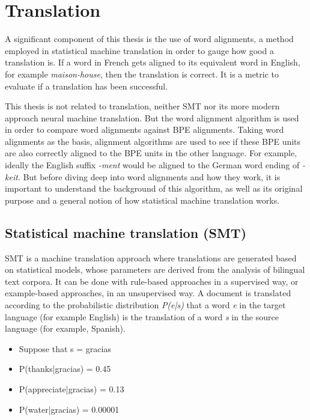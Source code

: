 %
%

\section{Translation}\label{ch:translation}

A significant component of this thesis is the use of word alignments, a method employed in statistical machine translation in order to gauge how good a translation is. If a word in French gets aligned to its equivalent word in English, for example \emph{maison-house}, then the translation is correct. It is a metric to evaluate if a translation has been successful.

This thesis is not related to translation, neither SMT nor its more modern approach neural machine translation. But the word alignment algorithm is used in order to compare word alignments against BPE alignments. Taking word alignments as the basis, alignment algorithms are used to see if these BPE units are also correctly aligned to the BPE units in the other language. For example, ideally the English suffix \emph{-ment} would be aligned to the German word ending of \emph{-keit}. But before diving deep into word alignments and how they work, it is important to understand the background of this algorithm, as well as its original purpose and a general notion of how statistical machine translation works.

\subsection{Statistical machine translation (SMT)}

SMT is a machine translation approach where translations are generated based on statistical models, whose parameters are derived from the analysis of bilingual text corpora. It can be done with rule-based approaches in a supervised way, or example-based approaches, in an unsupervised way. A document is translated according to the probabilistic distribution \emph{P(e|s)} that a word \emph{e} in the target language (for example English) is the translation of a word \emph{s} in the source language (for example, Spanish).

\begin{itemize}
	\item Suppose that s = gracias
	\item P(thanks|gracias) = 0.45
	\item P(appreciate|gracias) = 0.13
	\item P(water|gracias) = 0.00001
\end{itemize}

